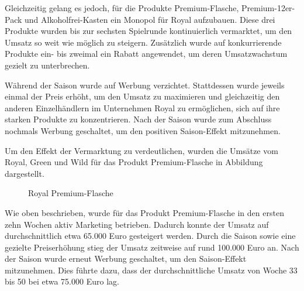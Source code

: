 \documentclass[a4paper,12pt]{article}
\begin{document}
Gleichzeitig gelang es jedoch, für die Produkte Premium-Flasche,
Premium-12er-Pack und Alkoholfrei-Kasten ein Monopol für Royal aufzubauen.
Diese drei Produkte wurden bis zur sechsten Spielrunde kontinuierlich vermarktet,
um den Umsatz so weit wie möglich zu steigern.
Zusätzlich wurde auf konkurrierende Produkte ein- bis zweimal ein Rabatt angewendet,
um deren Umsatzwachstum gezielt zu unterbrechen.

Während der Saison wurde auf Werbung verzichtet.
Stattdessen wurde jeweils einmal der Preis erhöht,
um den Umsatz zu maximieren und gleichzeitig den anderen Einzelhändlern im Unternehmen Royal zu ermöglichen,
sich auf ihre starken Produkte zu konzentrieren.
Nach der Saison wurde zum Abschluss nochmals Werbung geschaltet, um den positiven Saison-Effekt mitzunehmen.

Um den Effekt der Vermarktung zu verdeutlichen, wurden die Umsätze vom Royal, 
Green und Wild für das Produkt Premium-Flasche in Abbildung dargestellt.
\begin{figure}[H]
    \centering
    \caption{Royal Premium-Flasche}
    \label{fig:Royal Premium-Flasche}
\end{figure}
Wie oben beschrieben, wurde für das Produkt Premium-Flasche in den ersten zehn Wochen aktiv Marketing betrieben. 
Dadurch konnte der Umsatz auf durchschnittlich etwa 65.000 Euro gesteigert werden.
Durch die Saison sowie eine gezielte Preiserhöhung stieg der Umsatz zeitweise auf rund 100.000 Euro an.
Nach der Saison wurde erneut Werbung geschaltet, um den Saison-Effekt mitzunehmen.
Dies führte dazu, dass der durchschnittliche Umsatz von Woche 33 bis 50 bei etwa 75.000 Euro lag.
\end{document}
